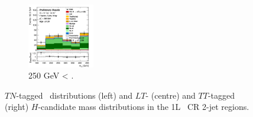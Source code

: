 \begin{figure}[h!]
\begin{subfigure}[b]{\textwidth}
        \includegraphics[width=0.32\textwidth]{Images/VH/Own_fit/postfit_VHcc/Region_distmBB_BMin250_DCRHigh_J2_TTypett_T2_L1_Y6051_GlobalFit_conditionnal_mu1.png}
        \caption{250 GeV < \ptv.}
        \label{fig:plots_VHcc_1L_250_CRH_2J}
    \end{subfigure}
    \caption{$TN$-tagged \ptv\ distributions (left) and $LT$- (centre) and $TT$-tagged (right) $H$-candidate mass distributions in the 1L \highdr\ CR 2-jet regions.}
    \label{fig:plots_VHcc_1L_CRH_2J}
\end{figure}

\vspace*{\fill} \newpage
\vspace*{\fill} 

